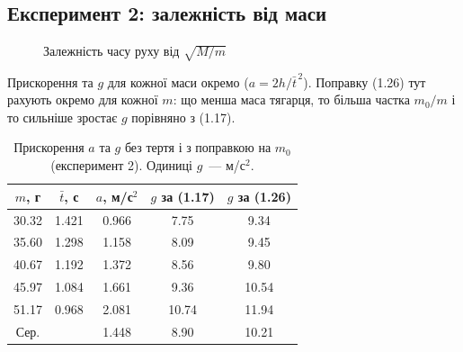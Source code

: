 \documentclass[ukrainian]{ucaphyslab}
\begin{document}
\subsection{Експеримент 2: залежність від маси}

\begin{figure}[H]
  \centering
  \caption{Залежність часу руху від $\sqrt{M/m}$}
\end{figure}

Прискорення та $g$ для кожної маси окремо ($a = 2h/\bar t^{\,2}$).
Поправку (1.26) тут рахують окремо для кожної $m$: що менша маса тягарця,
то більша частка $m_0/m$ і то сильніше зростає $g$ порівняно з (1.17).

\begin{table}[H]
  \centering
  \begin{tabular}{@{}ccccc@{}}
    \toprule
    $m$, г & $\bar t$, с & $a$, м/с$^2$ & $g$ за (1.17) & $g$ за (1.26) \\
    \midrule
    30.32 & 1.421 & 0.966 & 7.75 & 9.34 \\
    35.60 & 1.298 & 1.158 & 8.09 & 9.45 \\
    40.67 & 1.192 & 1.372 & 8.56 & 9.80 \\
    45.97 & 1.084 & 1.661 & 9.36 & 10.54 \\
    51.17 & 0.968 & 2.081 & 10.74 & 11.94 \\
    \midrule
    Сер. & & 1.448 & 8.90 & 10.21 \\
    \bottomrule
  \end{tabular}
  \caption{Прискорення $a$ та $g$ без тертя і з поправкою на $m_0$ (експеримент 2).
  Одиниці $g$~--- м/с$^2$.}
\end{table}
\end{document}
